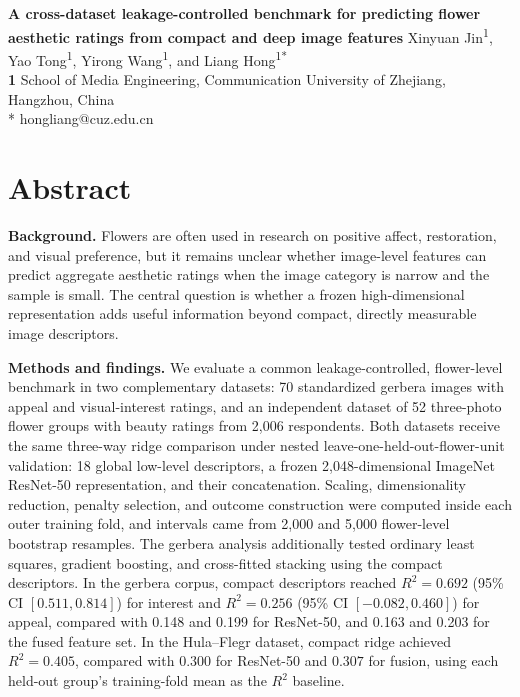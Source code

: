 \documentclass[10pt,letterpaper]{article}
\begin{document}
\vspace*{0.2in}

\begin{flushleft}
{\Large
\textbf{A cross-dataset leakage-controlled benchmark for predicting flower aesthetic ratings from compact and deep image features}
}
\newline
Xinyuan Jin\textsuperscript{1}, Yao Tong\textsuperscript{1}, Yirong Wang\textsuperscript{1}, and Liang Hong\textsuperscript{1*}
\\
\bigskip
\textbf{1} School of Media Engineering, Communication University of Zhejiang, Hangzhou, China
\\
\bigskip
* hongliang@cuz.edu.cn
\end{flushleft}

\section*{Abstract}
\textbf{Background.} Flowers are often used in research on positive affect, restoration, and visual preference, but it remains unclear whether image-level features can predict aggregate aesthetic ratings when the image category is narrow and the sample is small. The central question is whether a frozen high-dimensional representation adds useful information beyond compact, directly measurable image descriptors.

\textbf{Methods and findings.} We evaluate a common leakage-controlled, flower-level benchmark in two complementary datasets: 70 standardized gerbera images with appeal and visual-interest ratings, and an independent dataset of 52 three-photo flower groups with beauty ratings from 2,006 respondents. Both datasets receive the same three-way ridge comparison under nested leave-one-held-out-flower-unit validation: 18 global low-level descriptors, a frozen 2,048-dimensional ImageNet ResNet-50 representation, and their concatenation. Scaling, dimensionality reduction, penalty selection, and outcome construction were computed inside each outer training fold, and intervals came from 2,000 and 5,000 flower-level bootstrap resamples. The gerbera analysis additionally tested ordinary least squares, gradient boosting, and cross-fitted stacking using the compact descriptors. In the gerbera corpus, compact descriptors reached $R^2 = 0.692$ (95\% CI $[0.511, 0.814]$) for interest and $R^2 = 0.256$ (95\% CI $[-0.082, 0.460]$) for appeal, compared with 0.148 and 0.199 for ResNet-50, and 0.163 and 0.203 for the fused feature set.
 In the Hula--Flegr dataset, compact ridge achieved $R^2=0.405$, compared with $0.300$ for ResNet-50 and $0.307$ for fusion, using each held-out group's training-fold mean as the $R^2$ baseline.
 
\end{document}
